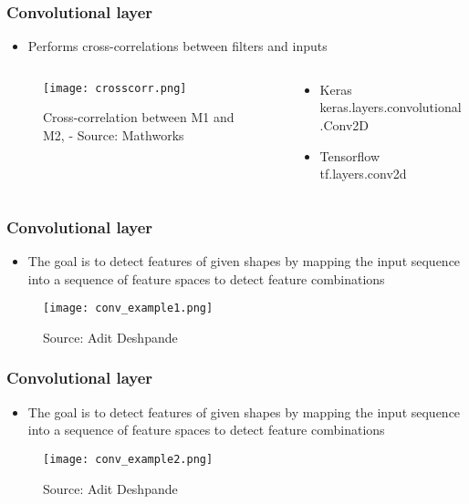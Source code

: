 \documentclass{beamer}
\begin{document}
\begin{frame}
	\frametitle{Convolutional layer}
    \begin{itemize}
    \item Performs cross-correlations between filters and inputs
    \end{itemize}
    \begin{columns}[T]
     \begin{column}{.5\textwidth}
    \begin{block}{}
     \begin{figure}
		\texttt{[image: crosscorr.png]}
		\caption{Cross-correlation between M1 and M2, - Source: Mathworks}
	 \end{figure}
    \end{block}
    \end{column}
    \begin{column}{.5\textwidth}
    \begin{block}{}
    \begin{itemize}
    	\item Keras
        keras.layers.convolutional .Conv2D
        \item Tensorflow\\
        tf.layers.conv2d
    \end{itemize}
    \end{block}
    \end{column}
    \end{columns}
\end{frame}

\begin{frame}
\frametitle{Convolutional layer}
  \begin{itemize}
      \item The goal is to detect features of given shapes by mapping the input sequence into a sequence of feature spaces to detect feature combinations
    \end{itemize}
    \begin{figure}
		\texttt{[image: conv\_example1.png]}
		\caption{Source: Adit Deshpande}
	 \end{figure}
\end{frame}

\begin{frame}
\frametitle{Convolutional layer}
  \begin{itemize}
      \item The goal is to detect features of given shapes by mapping the input sequence into a sequence of feature spaces to detect feature combinations
    \end{itemize}
    \begin{figure}
		\texttt{[image: conv\_example2.png]}
		\caption{Source: Adit Deshpande}
	 \end{figure}
\end{frame}
\end{document}
